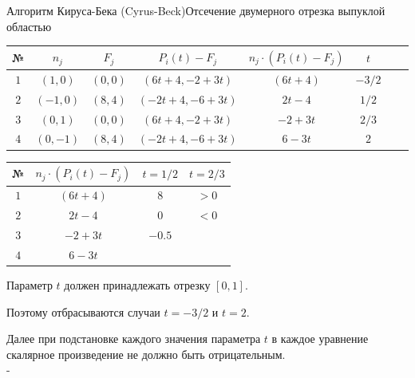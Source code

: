 \documentclass{beamer}
\begin{document}
\begin{frame}{Алгоритм Кируса-Бека (Cyrus-Beck)}{Отсечение двумерного отрезка выпуклой областью}
{	\begin{table}
		\begin{center}
			\begin{tabular}{|c|c|c|c|c|c|c|c|}
				\hline
				№ & $n_j$ & $F_j$ & $P_i(t) - F_j$ & $n_j \cdot (P_i(t) - F_j)$ & $t$ \\
				\hline
				$1$ & $(1,0)$ & $(0,0)$ &$(6t+4, -2+3t)$ & $(6t+4)$ & $-3/2$ \\
				\hline
				$2$ & $(-1,0)$ & $(8,4)$ & $(-2t+4, -6+3t)$ & $2t-4$ & $1/2$ \\
				\hline
				$3$ & $(0,1)$ & $(0,0)$ & $(6t+4, -2+3t)$ & $-2+3t$ & $2/3$ \\
				\hline
				$4$ & $(0,-1)$ & $(8,4)$ & $(-2t+4, -6+3t)$ & $6-3t$ & $2$ \\
				\hline
			\end{tabular}
		\end{center}
	\end{table}

	\begin{table}
		\begin{center}
			\begin{tabular}{|c|c|c|c|}
				\hline
				№ & $n_j \cdot (P_i(t) - F_j)$ & $t = 1/2$ & $ t = 2/3 $ \\
				\hline
				$1$ & $(6t+4)$ & $8$ & $>0$ \\
				\hline
				$2$ & $2t-4$ & $0$ & $<0$ \\
				\hline
				$3$ & $-2+3t$ & $-0.5$ & \\
				\hline
				$4$ & $6-3t$ & &  \\
				\hline
			\end{tabular}
		\end{center}
	\end{table}

	\footnotesize
	Параметр $t$ должен принадлежать отрезку $[0,1]$.
	
	Поэтому отбрасываются случаи $t = -3/2$ и $t = 2$.

	Далее при подстановке каждого значения параметра $t$ в каждое уравнение скалярное произведение не должно быть отрицательным.
	\\
	-
}
\end{frame}
\end{document}
